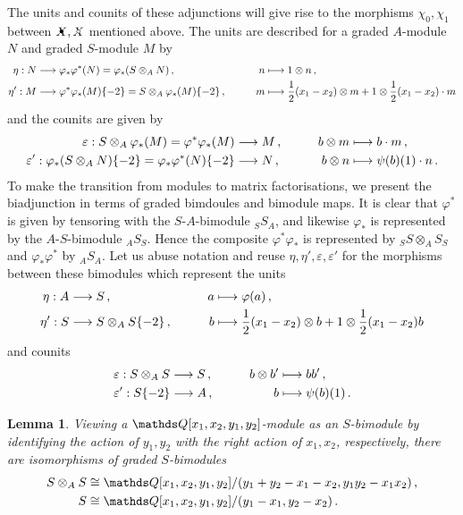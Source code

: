 \documentclass{compositio}
\newtheorem{lemma}[theorem]{Lemma}
\theoremstyle{definition}
\numberwithin{equation}{section}
\begin{document}
The units and counits of these adjunctions will give rise to the morphisms $\chi_0, \chi_1$ between $\Xbul, \Xcirc$ mentioned above. The units are described for a graded $A$-module $N$ and graded $S$-module $M$ by
\begin{align*}
\eta: N & \longrightarrow \varphi_* \varphi^*(N) = \varphi_*( S \otimes_A N ) \, , \qquad & n & \longmapsto 1 \otimes n \, ,\\
\eta': M & \longrightarrow \varphi^* \varphi_*(M)\{-2\} = S \otimes_A \varphi_*(M) \{-2\} \, , \qquad & m & \longmapsto \frac{1}{2}(x_1-x_2) \otimes m + 1 \otimes \frac{1}{2}(x_1 - x_2) \cdot m
\end{align*}
and the counits are given by
\begin{align*}
\varepsilon: S \otimes_A \varphi_*(M) = \varphi^* \varphi_*(M) & \longrightarrow M \, , \qquad & b \otimes m & \longmapsto b \cdot m \, ,\\
\varepsilon': \varphi_*(S \otimes_A N)\{-2\} = \varphi_*\varphi^*(N)\{-2\} & \longrightarrow N \, , \qquad & b \otimes n & \longmapsto \psi(b)(1) \cdot n \, .
\end{align*}
To make the transition from modules to matrix factorisations, we present the biadjunction in terms of graded bimdoules and bimodule maps. It is clear that $\varphi^*$ is given by tensoring with the $S$-$A$-bimodule ${}_S S_A$, and likewise $\varphi_*$ is represented by the $A$-$S$-bimodule ${}_A S_S$. Hence the composite $\varphi^* \varphi_*$ is represented by ${}_S S \otimes_A S {}_S$ and $\varphi_* \varphi^*$ by ${}_A S {}_A$. Let us abuse notation and reuse $\eta, \eta', \varepsilon, \varepsilon'$ for the morphisms between these bimodules which represent the units
\begin{align*}
\eta: A & \longrightarrow S \, , \qquad & a & \longmapsto \varphi(a)\,,\\
\eta': S & \longrightarrow S \otimes_A S\{-2\} \, , \qquad & b &\longmapsto \frac{1}{2}(x_1 - x_2) \otimes b + 1 \otimes \frac{1}{2}(x_1 - x_2)b
\end{align*}
and counits
\begin{align*}
& \varepsilon: S \otimes_A S \longrightarrow S \, , \qquad & b \otimes b' & \longmapsto bb'\,,\\
& \varepsilon': S\{-2\} \longrightarrow A \, , \qquad & b & \longmapsto \psi(b)(1) \, . 
\end{align*}

\begin{lemma}\label{lemma:bimodules_as_algebras} Viewing a $\QQ[x_1,x_2,y_1,y_2]$-module as an $S$-bimodule by identifying the action of $y_1, y_2$ with the right action of $x_1, x_2$, respectively, there are isomorphisms of graded $S$-bimodules
\begin{align*}
S \otimes_A S & \cong \QQ[x_1,x_2,y_1,y_2]/(y_1 + y_2 - x_1 - x_2, y_1 y_2 - x_1 x_2) \, ,\\
S & \cong \QQ[x_1,x_2,y_1,y_2]/(y_1 - x_1, y_2 - x_2)\,.
\end{align*}
\end{lemma}
\end{document}
